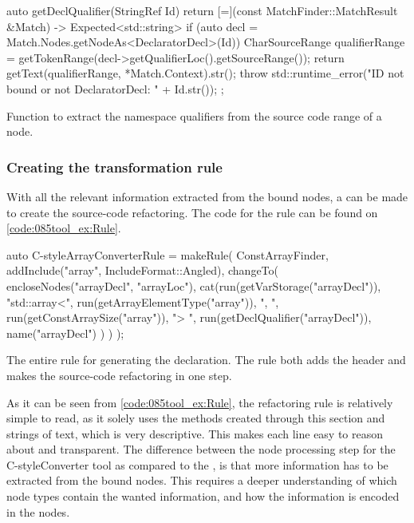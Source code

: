 \begin{listing}[H]
    \begin{cppcode}
auto getDeclQualifier(StringRef Id) {
    return [=](const MatchFinder::MatchResult &Match) -> Expected<std::string> {
        if (auto decl = Match.Nodes.getNodeAs<DeclaratorDecl>(Id)) {
            CharSourceRange qualifierRange = getTokenRange(decl->getQualifierLoc().getSourceRange());
            return getText(qualifierRange, *Match.Context).str();
        }
        throw std::runtime_error("ID not bound or not DeclaratorDecl: " + Id.str());
    };
}
    \end{cppcode}
    \caption{Function to extract the namespace qualifiers from the source code range of a  node.}
    \label{code:085tool_ex:DeclaratorQualif}
\end{listing}

\subsubsection*{Creating the transformation rule}

With all the relevant information extracted from the bound nodes, a  can be made to create the source-code refactoring. The code for the rule can be found on \cref{code:085tool_ex:Rule}.

\begin{listing}[H]
    \begin{cppcode}
auto C-styleArrayConverterRule = makeRule(
    ConstArrayFinder,
    {
        addInclude("array", IncludeFormat::Angled),
        changeTo(
            encloseNodes("arrayDecl", "arrayLoc"),
            cat(run(getVarStorage("arrayDecl")),
                "std::array<",
                run(getArrayElementType("array")),
                ", ",
                run(getConstArraySize("array")),
                "> ",
                run(getDeclQualifier("arrayDecl")),
                name("arrayDecl")
            )
        )
    });
    \end{cppcode}
    \caption{The entire rule for generating the  declaration. The rule both adds the  header and makes the source-code refactoring in one step.}
    \label{code:085tool_ex:Rule}
\end{listing}

As it can be seen from \cref{code:085tool_ex:Rule}, the refactoring rule is relatively simple to read, as it solely uses the methods created through this section and strings of text, which is very descriptive. This makes each line easy to reason about and transparent. The difference between the node processing step for the C-styleConverter tool as compared to the , is that more information has to be extracted from the bound nodes. This requires a deeper understanding of which node types contain the wanted information, and how the information is encoded in the nodes.


